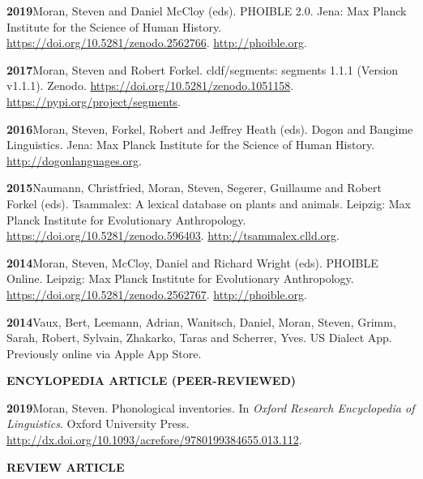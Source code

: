 \documentclass[11pt]{article}
\newcommand{\hangpara}{
 \setlength{\parindent}{0in} %
 \hangindent=0.42in %
}
\begin{document}
\vskip 6pt
\hangpara
{\bf 2019}\hspace{1ex}Moran, Steven and Daniel McCloy (eds). PHOIBLE 2.0. Jena: Max Planck Institute for the Science of Human History. \url{https://doi.org/10.5281/zenodo.2562766}. \url{http://phoible.org}.

\vskip 6pt
\hangpara
{\bf 2017}\hspace{1ex}Moran, Steven and Robert Forkel. cldf/segments: segments 1.1.1 (Version v1.1.1). Zenodo. \url{https://doi.org/10.5281/zenodo.1051158}. \url{https://pypi.org/project/segments}.

\vskip 6pt
\hangpara
{\bf 2016}\hspace{1ex}Moran, Steven, Forkel, Robert and Jeffrey Heath (eds). Dogon and Bangime Linguistics. Jena: Max Planck Institute for the Science of Human History. \url{http://dogonlanguages.org}.

\vskip 6pt
\hangpara
{\bf 2015}\hspace{1ex}Naumann, Christfried, Moran, Steven, Segerer, Guillaume and Robert Forkel (eds). Tsammalex: A lexical database on plants and animals. Leipzig: Max Planck Institute for Evolutionary Anthropology. \url{https://doi.org/10.5281/zenodo.596403}. \url{http://tsammalex.clld.org}.

\vskip 6pt
\hangpara
{\bf 2014}\hspace{1ex}Moran, Steven, McCloy, Daniel and Richard Wright (eds). PHOIBLE Online. Leipzig: Max Planck Institute for Evolutionary Anthropology. \url{https://doi.org/10.5281/zenodo.2562767}. \url{http://phoible.org}.

\vskip 6pt
\hangpara
{\bf 2014}\hspace{1ex}Vaux, Bert, Leemann, Adrian, Wanitsch, Daniel, Moran, Steven, Grimm, Sarah, Robert, Sylvain, Zhakarko, Taras and Scherrer, Yves. US Dialect App. Previously online via Apple App Store. %


\vskip 20pt
\begin{flushleft}
{\bf ENCYLOPEDIA ARTICLE (PEER-REVIEWED)}
\end{flushleft}

\hangpara
{\bf 2019}\hspace{1ex}Moran, Steven. Phonological inventories. In \textit{Oxford Research Encyclopedia of Linguistics}. Oxford University Press. \url{http://dx.doi.org/10.1093/acrefore/9780199384655.013.112}.

\clearpage
\vskip 20pt
\begin{flushleft}
{\bf REVIEW ARTICLE}
\end{flushleft}
\end{document}
